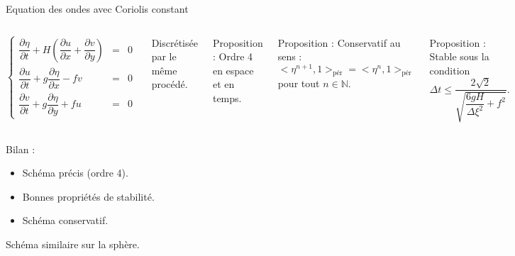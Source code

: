 \documentclass[11pt]{beamer}
\begin{document}
\begin{frame}{Equation des ondes avec Coriolis constant}
\begin{columns}
$$
\left\lbrace
\begin{array}{rcl}
\dfrac{\partial \eta}{\partial t} + H \left( \dfrac{\partial u}{\partial x} + \dfrac{\partial v}{\partial y} \right) & = & 0 \\
\dfrac{\partial u}{\partial t} + g \dfrac{\partial \eta}{\partial x} - fv & = & 0\\
\dfrac{\partial v}{\partial t} + g \dfrac{\partial \eta}{\partial y} + fu & = & 0
\end{array}
\right.
$$

Discrétisée par le même procédé.

\begin{block}{Proposition :}
Ordre 4 en espace et en temps.
\end{block}

\begin{block}{Proposition :}
Conservatif au sens :
$$
<\eta^{n+1},\mathfrak{1}>_{\text{pér}} = <\eta^{n},\mathfrak{1}>_{\text{pér}}
$$
pour tout $n \in \mathbb{N}$.
\end{block}

\begin{block}{Proposition :}
Stable sous la condition
$$
\Delta t \leq \dfrac{2 \sqrt{2}}{\sqrt{\dfrac{6gH}{\Delta \xi^2} + f^2}}.
$$
\end{block}





\end{columns}
\end{frame}

























\begin{frame}{}

\begin{block}{Bilan :}
\begin{itemize}
\item Schéma précis (ordre 4).
\item Bonnes propriétés de stabilité.
\item Schéma conservatif.
\end{itemize}
\end{block}

\begin{exampleblock}{}
Schéma similaire sur la sphère.
\end{exampleblock}

\end{frame}
\end{document}
